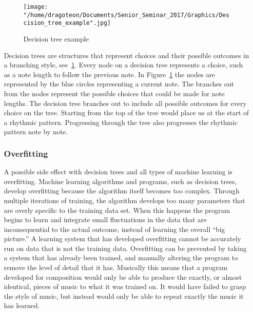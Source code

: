 \documentclass{sig-alternate}
\begin{document}
\begin{figure}[p]
	\texttt{[image: "/home/dragoteon/Documents/Senior\_Seminar\_2017/Graphics/Descision\_tree\_example".jpg]}
	\caption{Decision tree example}
	\label{fig:decisiontree}
\end{figure}

Decision trees are structures that represent choices and their possible outcomes in a branching style, see~\ref{fig:decisiontree}. Every node on a decision tree represents a choice, such as a note length to follow the previous note. In Figure~\ref{fig:decisiontree} the nodes are represented by the blue circles representing a current note. The branches out from the nodes represent the possible choices that could be made for note lengths. The decision tree branches out to include all possible outcomes for every choice on the tree.  Starting from the top of the tree would place us at the start of a rhythmic pattern. Progressing through the tree also progresses the rhythmic pattern note by note. 



\subsubsection{Overfitting}
\label{sec:overfitting}
A possible side effect with decision trees and all types of machine learning is overfitting. Machine learning algorithms and programs, such as decision trees, develop overfitting because the algorithm itself becomes too complex. Through multiple iterations of training, the algorithm develops too many parameters that are overly specific to the training data set. When this happens the program begins to learn and integrate small fluctuations in the data that are inconsequential to the actual outcome, instead of learning the overall ``big picture.'' A learning system that has developed overfitting cannot be accurately run on data that is not the training data. Overfitting can be prevented by taking a system that has already been trained, and manually altering the program to remove the level of detail that it has. Musically this means that a program developed for composition would only be able to produce the exactly, or almost identical, pieces of music to what it was trained on. It would have failed to grasp the style of music, but instead would only be able to repeat exactly the music it has learned.
\end{document}

